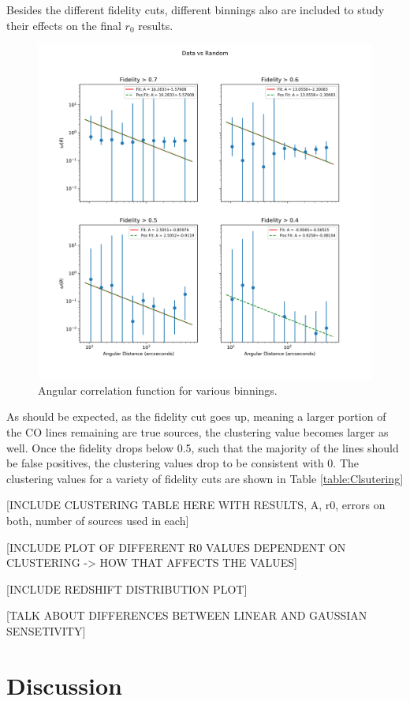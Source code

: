Besides the different fidelity cuts, different binnings also are included to study their effects on the final $r_0$ results. 

\begin{figure}[tbp]
\centering \includegraphics[width=120mm]{Fidelity/Log_4Panel_Data_Vs_Random_bin10_NFalse_Num10000.png}
\caption{Angular correlation function for various binnings.}
\label{fig:Angular_binnings}
\end{figure}

As should be expected, as the fidelity cut goes up, meaning a larger portion of the CO lines remaining are true sources, the clustering value becomes larger as well. Once the fidelity drops below 0.5, such that the majority of the lines should be false positives, the clustering values drop to be consistent with 0. The clustering values for a variety of fidelity cuts are shown in Table \ref{table:Clsutering}

[INCLUDE CLUSTERING TABLE HERE WITH RESULTS, A, r0, errors on both, number of sources used in each] \label{table:Clustering}

[INCLUDE PLOT OF DIFFERENT R0 VALUES DEPENDENT ON CLUSTERING -> HOW THAT AFFECTS THE VALUES]

[INCLUDE REDSHIFT DISTRIBUTION PLOT]

[TALK ABOUT DIFFERENCES BETWEEN LINEAR AND GAUSSIAN SENSETIVITY]

\section{Discussion}

